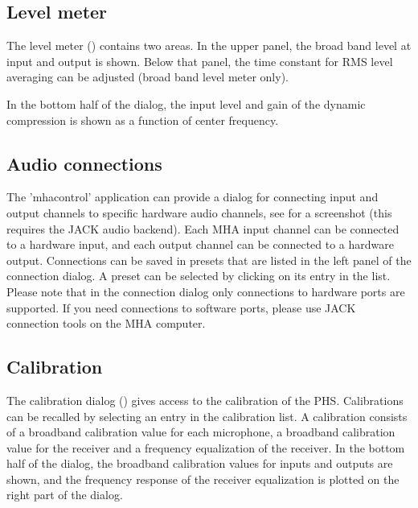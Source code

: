 \documentclass[11pt,a4paper,twoside]{article}
\begin{document}
\subsection{Level meter}\label{sec:levels}

The level meter () contains two areas.
%
In the upper panel, the broad band level at input and output is shown.
%
Below that panel, the time constant for RMS level averaging can be
adjusted (broad band level meter only).

In the bottom half of the dialog, the input level and gain of the
dynamic compression is shown as a function of center frequency.


\subsection{Audio connections}\label{sec:audioconnections}

The 'mhacontrol' application can provide a dialog for connecting input
and output channels to specific hardware audio channels, see
 for a screenshot (this
requires the JACK audio backend).
%
Each MHA input channel can be connected to a hardware input, and
each output channel can be connected to a hardware output.
%
Connections can be saved in presets that are listed in the left panel of the connection dialog.
%
A preset can be selected by clicking on its entry in the list.
%
Please note that in the connection dialog only connections to hardware
ports are supported.
%
If you need connections to software ports, please use JACK connection
tools on the MHA computer.
%


\subsection{Calibration}\label{sec:calibration}

The calibration dialog () gives access
to the calibration of the PHS.
%
Calibrations can be recalled by selecting an entry in the calibration
list.
%
A calibration consists of a broadband calibration value for each
microphone, a broadband calibration value for the receiver and a
frequency equalization of the receiver.
%
In the bottom half of the dialog, the broadband calibration values for
inputs and outputs are shown, and the frequency response of the
receiver equalization is plotted on the right part of the dialog.
\end{document}
